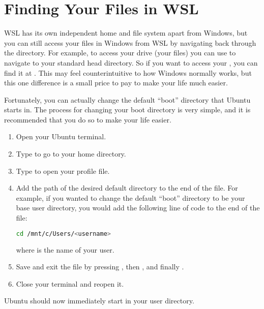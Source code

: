 \begin{enumerate}


\end{enumerate}


\section*{Finding Your Files in WSL}

WSL has its own independent home and file system apart from Windows, but you can still access your files in Windows from WSL by navigating back through the  directory.
For example, to access your  drive (your files) you can use  to navigate to your standard head directory.
So if you want to access your , you can find it at .
This may feel counterintuitive to how Windows normally works, but this one difference is a small price to pay to make your life much easier.

Fortunately, you can actually change the default ``boot'' directory that Ubuntu starts in.
The process for changing your boot directory is very simple, and it is recommended that you do so to make your life easier.
\begin{enumerate}
    \item Open your Ubuntu terminal.
    \item Type  to go to your home directory.
    \item Type  to open your profile file.
    \item Add the path of the desired default directory to the end of the file.
    For example, if you wanted to change the default ``boot'' directory to be your base user directory, you would add the following line of code to the end of the file:
\begin{lstlisting}[language=bash]
cd /mnt/c/Users/<username>
\end{lstlisting}
    where  is the name of your user.
    \item Save and exit the file by pressing , then , and finally .
    \item Close your terminal and reopen it.
\end{enumerate}
Ubuntu should now immediately start in your user directory.
\fi


